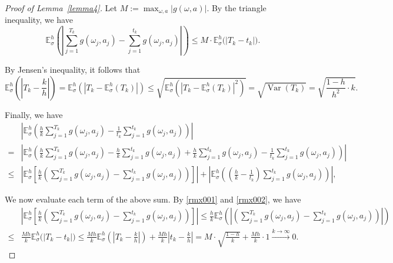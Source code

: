 \documentclass[english,openary,11pt]{article}
\theoremstyle{definition}
\newcommand{\E}{\mathbb{E}}
\begin{document}
\begin{proof}[Proof of Lemma~\ref{lemma4}]
Let
$M := \max_{\omega, a} |g(\omega, a)|.$
By the triangle inequality, we have 
\begin{equation}
\E_{\sigma}^h \left(\left| \sum_{j = 1}^{T_k} g(\omega_j, a_j) - \sum_{j = 1}^{t_k} g(\omega_j, a_j)\right|\right) \le M \cdot \E_{\sigma}^h \big( |T_k - t_k| \big).
\label{rmx001}
\end{equation}

By Jensen's inequality, it follows that
\begin{equation}
\E_{\sigma}^h \left(\left|T_k - \frac k h \right| \right) = \E_{\sigma}^h \left(\left|T_k - \E_{\sigma}^h (T_k) \right|\right) \le \sqrt{\E_{\sigma}^h \left(\left|T_k - \E_{\sigma}^h (T_k) \right|^2\right)} =  \sqrt{\operatorname{Var}(T_k)} = \sqrt{\frac{1-h}{h^2} \cdot k }.
\label{rmx002}
\end{equation}

Finally, we have
\begin{equation}
\begin{aligned}
&\left|\E_{\sigma}^h\left( \frac{h}{k} \sum_{j = 1}^{T_k} g(\omega_j, a_j) 
-
\frac{1}{t_k} \sum_{j = 1}^{t_k} g(\omega_j, a_j) \right)\right| \\
= 
&\left|\E_{\sigma}^h\left( \frac{h}{k} \sum_{j = 1}^{T_k} g(\omega_j, a_j) 
-
\frac{h}{k} \sum_{j = 1}^{t_k} g(\omega_j, a_j)
+
\frac{h}{k}\sum_{j = 1}^{t_k} g(\omega_j, a_j)
-
\frac{1}{t_k} \sum_{j = 1}^{t_k} g(\omega_j, a_j) \right)\right| \\
\le
&\left|\E_{\sigma}^h \left[ \frac{h}{k} \left( \sum_{j = 1}^{T_k} g(\omega_j, a_j) 
-
\sum_{j = 1}^{t_k} g(\omega_j, a_j)\right) \right] \right|
+
\left| \E_{\sigma}^h \left(\left( \frac{h}{k} - \frac{1}{t_k}\right) \sum_{j = 1}^{t_k} g(\omega_j, a_j) \right) \right|,
\end{aligned}
\label{rmx003}
\end{equation}

We now evaluate each term of the above sum. By \eqref{rmx001} and \eqref{rmx002}, we have
\begin{equation}
\begin{aligned}
& \left|\E_{\sigma}^h \left[ \frac{h}{k} 
\left( \sum_{j = 1}^{T_k} g(\omega_j, a_j) 
-
\sum_{j = 1}^{t_k} g(\omega_j, a_j)\right) \right] \right|
\le
\frac{h}{k} \E_{\sigma}^h \left( \left|
\left( \sum_{j = 1}^{T_k} g(\omega_j, a_j) 
-
\sum_{j = 1}^{t_k} g(\omega_j, a_j)\right) \right|\right) \\
\le &
\frac{M h}{k} \E_{\sigma}^h \big( \left|T_k - t_k \right| \big)
\le
\frac{M h}{k} \E_{\sigma}^h \left(\left|T_k - \frac{k}{h}\right| \right)
+
\frac{M h}{k} \left|t_k - \frac{k}{h}\right| 
= M \cdot \sqrt{\frac{1-h}{k}} + 
\frac{M h}{k} \cdot 1 \xrightarrow{k \to \infty} 0.
\end{aligned}
\label{rmx004}
\end{equation}


\end{proof}
\end{document}
